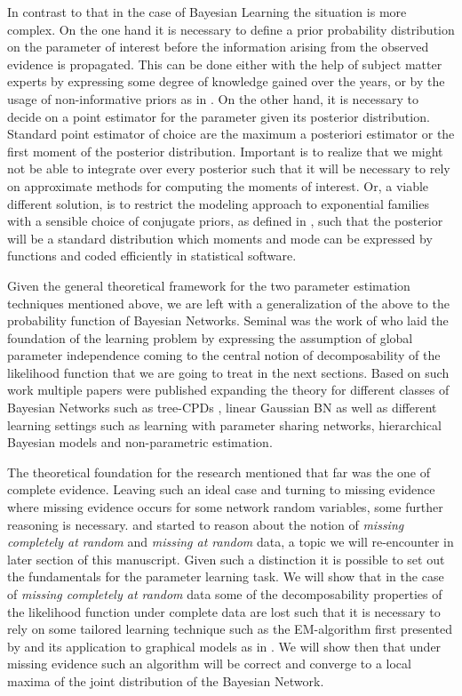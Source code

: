 \documentclass[11pt]{article}
\begin{document}
\begin{article}
In contrast to that in the case of Bayesian Learning the situation
is more complex. On the one hand it is necessary to define a prior
probability distribution on the parameter of interest before the
information arising from the observed evidence is propagated. This
can be done either with the help of subject matter experts by
expressing some degree of knowledge gained over the years, or by
the usage of non-informative priors as in
\cite{syversveen1998noninformative}. On the other hand, it is
necessary to decide on a point estimator for the parameter given
its posterior distribution. Standard point estimator of choice are
the maximum a posteriori estimator or the first moment of the
posterior distribution. Important is to realize that we might not
be able to integrate over every posterior such that it will be
necessary to rely on approximate methods for computing the moments
of interest. Or, a viable different solution, is to restrict the
modeling approach to exponential families with a sensible choice of
conjugate priors, as defined in \cite{schlaifer1961applied}, such
that the posterior will be a standard distribution which moments
and mode can be expressed by functions and coded efficiently in
statistical software.

Given the general theoretical framework for the two parameter
estimation techniques mentioned above, we are left with a
generalization of the above to the probability function of Bayesian
Networks. Seminal was the work of \cite{spiegelhalter1990sequential}
who laid the foundation of the learning problem by expressing the
assumption of global parameter independence coming to the central
notion of decomposability of the likelihood function that we are
going to treat in the next sections. Based on such work multiple
papers were published expanding the theory for different classes of
Bayesian Networks such as tree-CPDs \cite{buntine1993tree}, linear
Gaussian BN \cite{heckerman1995learning} as well as different
learning settings such as learning with parameter sharing networks,
hierarchical Bayesian models and non-parametric estimation.

The theoretical foundation for the research mentioned that far was
the one of complete evidence. Leaving such an ideal case and
turning to missing evidence where missing evidence occurs for some
network random variables, some further reasoning is
necessary. \cite{rubin1976inference} and \cite{little1976inference}
started to reason about the notion of \emph{missing completely at
random} and \emph{missing at random} data, a topic we will re-encounter
in later section of this manuscript. Given such a distinction it is
possible to set out the fundamentals for the parameter learning
task. We will show that in the case of \emph{missing completely at
random} data some of the decomposability properties of the
likelihood function under complete data are lost such that it is
necessary to rely on some tailored learning technique such as the
EM-algorithm first presented by \cite{dempster1977maximum} and its
application to graphical models as in \cite{lauritzen1995algorithm}.
We will show then that under missing evidence such an algorithm
will be correct and converge to a local maxima of the joint
distribution of the Bayesian Network.


\end{article}
\end{document}
